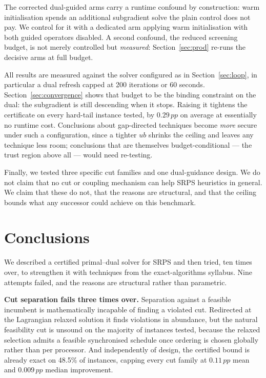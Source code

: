 \documentclass[11pt,a4paper]{article}
\newcommand{\pp}{\,pp}
\begin{document}
The corrected dual-guided arms carry a runtime confound by construction: warm
initialisation spends an additional subgradient solve the plain control does not
pay. We control for it with a dedicated arm applying warm initialisation with both
guided operators disabled. A second confound, the reduced screening budget, is not
merely controlled but \emph{measured}: Section~\ref{sec:prod} re-runs the decisive
arms at full budget.

All results are measured against the solver configured as in
Section~\ref{sec:loop}, in particular a dual refresh capped at 200 iterations or
60 seconds. Section~\ref{sec:convergence} shows that budget to be the binding
constraint on the dual: the subgradient is still descending when it stops. Raising
it tightens the certificate on every hard-tail instance tested, by $0.29\pp$ on
average at essentially no runtime cost. Conclusions about gap-directed techniques
become \emph{more} secure under such a configuration, since a tighter $ub$ shrinks
the ceiling and leaves any technique less room; conclusions that are themselves
budget-conditional --- the trust region above all --- would need re-testing.

Finally, we tested three specific cut families and one dual-guidance design. We do
not claim that no cut or coupling mechanism can help SRPS heuristics in general.
We claim that these do not, that the reasons are structural, and that the ceiling
bounds what any successor could achieve on this benchmark.

\section{Conclusions}\label{sec:conclusions}

We described a certified primal--dual solver for SRPS and then tried, ten times
over, to strengthen it with techniques from the exact-algorithms syllabus. Nine
attempts failed, and the reasons are structural rather than parametric.

\textbf{Cut separation fails three times over.} Separation against a feasible
incumbent is
mathematically incapable of finding a violated cut. Redirected at the Lagrangian
relaxed solution it finds violations in abundance, but the natural feasibility cut
is unsound on the majority of instances tested, because the relaxed selection
admits a feasible synchronised schedule once ordering is chosen globally rather
than per processor. And independently of design, the certified bound is already
exact on 48.5\% of instances, capping every cut family at $0.11\pp$ mean and
$0.009\pp$ median improvement.
\end{document}
